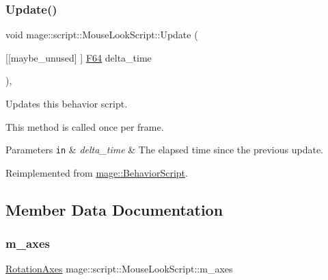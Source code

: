\hypertarget{classmage_1_1script_1_1_mouse_look_script_a6d38748c21a6bc475e8ac31e24459053}{}\label{classmage_1_1script_1_1_mouse_look_script_a6d38748c21a6bc475e8ac31e24459053} 
\subsubsection{\texorpdfstring{Update()}{Update()}}
{\footnotesize\ttfamily void mage\+::script\+::\+Mouse\+Look\+Script\+::\+Update (\begin{DoxyParamCaption}\item[{\mbox{[}\mbox{[}maybe\+\_\+unused\mbox{]} \mbox{]} \hyperlink{namespacemage_ad26233bbec640deda836e572c1a23708}{F64}}]{delta\+\_\+time }\end{DoxyParamCaption})\hspace{0.3cm}{\ttfamily [override]}, {\ttfamily [virtual]}}

Updates this behavior script.

This method is called once per frame.


\begin{DoxyParams}[1]{Parameters}
\mbox{\tt in}  & {\em delta\+\_\+time} & The elapsed time since the previous update. \\
\hline
\end{DoxyParams}


Reimplemented from \hyperlink{classmage_1_1_behavior_script_afb9cf3759edf8876416d1df85489cba6}{mage\+::\+Behavior\+Script}.



\subsection{Member Data Documentation}
\hypertarget{classmage_1_1script_1_1_mouse_look_script_ae41f05d545c70cd621a405f6ef0cd4d5}{}\label{classmage_1_1script_1_1_mouse_look_script_ae41f05d545c70cd621a405f6ef0cd4d5} 
\subsubsection{\texorpdfstring{m\+\_\+axes}{m\_axes}}
{\footnotesize\ttfamily \hyperlink{classmage_1_1script_1_1_mouse_look_script_aa8c8ce1a3e6ccefa7b8ddd31be209c23}{Rotation\+Axes} mage\+::script\+::\+Mouse\+Look\+Script\+::m\+\_\+axes\hspace{0.3cm}{\ttfamily [private]}}

